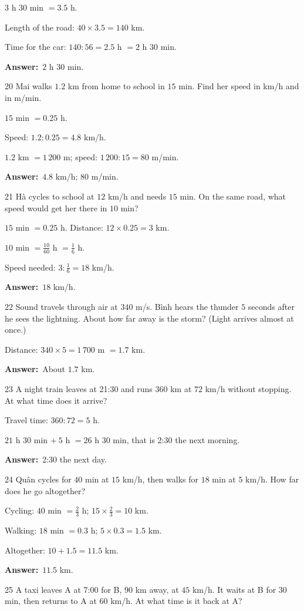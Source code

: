 \documentclass[11pt]{article}
\newif\ifsol \solfalse
\providecommand{\AnsWord}{Đáp số}
\newcommand{\dapso}[1]{\par\textbf{\AnsWord:}\ #1}
\newcommand{\probsol}[1]{%
  \begin{lrbox}{\solmeasure}\begin{minipage}{\dimexpr\linewidth-24pt\relax}#1\end{minipage}\end{lrbox}%
  \ifsol
    \begin{solbox}#1\end{solbox}%
  \else
    \setlength{\solht}{\dimexpr\ht\solmeasure+\dp\solmeasure+0.85cm\relax}%
    \ifdim\solht<1.35cm\setlength{\solht}{1.35cm}\fi
    \begin{tcolorbox}[colback=white,colframe=Line,boxrule=0.8pt,arc=5pt,
      left=8pt,right=8pt,top=4pt,bottom=4pt,height=\solht]{\footnotesize\color{Slate}\itshape\WorkWord}\end{tcolorbox}%
  \fi}
\newcommand{\gap}{\vspace{0.3cm}}
\def\WorkWord{Your work:}
\def\AnsWord{Answer}
\begin{document}
\probsol{
$3$ h $30$ min $=3.5$ h.\par
Length of the road: $40\times3.5=140$ km.\par
Time for the car: $140:56=2.5$ h $=2$ h $30$ min.
\dapso{$2$ h $30$ min.}}
\gap
\begin{probbox}{20}{\relax}
Mai walks $1.2$ km from home to school in $15$ min. Find her speed in km/h and in m/min.
\end{probbox}
\probsol{
$15$ min $=0.25$ h.\par
Speed: $1.2:0.25=4.8$ km/h.\par
$1.2$ km $=1\,200$ m; speed: $1\,200:15=80$ m/min.
\dapso{$4.8$ km/h; $80$ m/min.}}
\gap
\begin{probbox}{21}{\relax}
Hà cycles to school at $12$ km/h and needs $15$ min. On the same road, what speed would get her there in $10$ min?
\end{probbox}
\probsol{
$15$ min $=0.25$ h. Distance: $12\times0.25=3$ km.\par
$10$ min $=\frac{10}{60}$ h $=\frac16$ h.\par
Speed needed: $3:\frac16=18$ km/h.
\dapso{$18$ km/h.}}
\gap
\begin{probbox}{22}{\relax}
Sound travels through air at $340$ m/s. Bình hears the thunder $5$ seconds after he sees the lightning. About how far away is the storm? (Light arrives almost at once.)
\end{probbox}
\probsol{
Distance: $340\times5=1\,700$ m $=1.7$ km.
\dapso{About $1.7$ km.}}
\gap
\begin{probbox}{23}{\relax}
A night train leaves at 21:30 and runs $360$ km at $72$ km/h without stopping. At what time does it arrive?
\end{probbox}
\probsol{
Travel time: $360:72=5$ h.\par
$21$ h $30$ min $+\ 5$ h $=26$ h $30$ min, that is 2:30 the next morning.
\dapso{2:30 the next day.}}
\gap
\begin{probbox}{24}{\relax}
Quân cycles for $40$ min at $15$ km/h, then walks for $18$ min at $5$ km/h. How far does he go altogether?
\end{probbox}
\probsol{
Cycling: $40$ min $=\frac23$ h; $15\times\frac23=10$ km.\par
Walking: $18$ min $=0.3$ h; $5\times0.3=1.5$ km.\par
Altogether: $10+1.5=11.5$ km.
\dapso{$11.5$ km.}}
\gap
\begin{probbox}{25}{\relax}
A taxi leaves A at 7:00 for B, $90$ km away, at $45$ km/h. It waits at B for $30$ min, then returns to A at $60$ km/h. At what time is it back at A?
\end{probbox}
\end{document}
